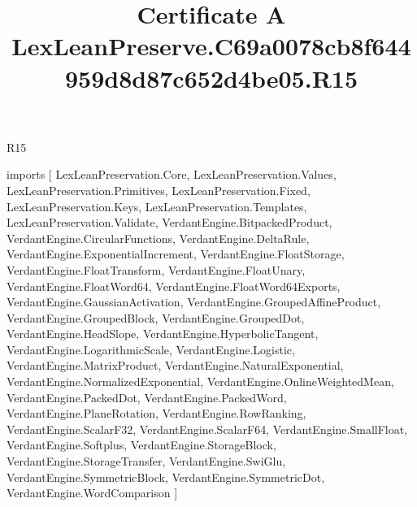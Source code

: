 \begin{lexlean}{R15}
\title{Certificate A LexLeanPreserve.C69a0078cb8f644959d8d87c652d4be05.R15}
\begin{coremodule}
imports [
  LexLeanPreservation.Core,
  LexLeanPreservation.Values,
  LexLeanPreservation.Primitives,
  LexLeanPreservation.Fixed,
  LexLeanPreservation.Keys,
  LexLeanPreservation.Templates,
  LexLeanPreservation.Validate,
  VerdantEngine.BitpackedProduct,
  VerdantEngine.CircularFunctions,
  VerdantEngine.DeltaRule,
  VerdantEngine.ExponentialIncrement,
  VerdantEngine.FloatStorage,
  VerdantEngine.FloatTransform,
  VerdantEngine.FloatUnary,
  VerdantEngine.FloatWord64,
  VerdantEngine.FloatWord64Exports,
  VerdantEngine.GaussianActivation,
  VerdantEngine.GroupedAffineProduct,
  VerdantEngine.GroupedBlock,
  VerdantEngine.GroupedDot,
  VerdantEngine.HeadSlope,
  VerdantEngine.HyperbolicTangent,
  VerdantEngine.LogarithmicScale,
  VerdantEngine.Logistic,
  VerdantEngine.MatrixProduct,
  VerdantEngine.NaturalExponential,
  VerdantEngine.NormalizedExponential,
  VerdantEngine.OnlineWeightedMean,
  VerdantEngine.PackedDot,
  VerdantEngine.PackedWord,
  VerdantEngine.PlaneRotation,
  VerdantEngine.RowRanking,
  VerdantEngine.ScalarF32,
  VerdantEngine.ScalarF64,
  VerdantEngine.SmallFloat,
  VerdantEngine.Softplus,
  VerdantEngine.StorageBlock,
  VerdantEngine.StorageTransfer,
  VerdantEngine.SwiGlu,
  VerdantEngine.SymmetricBlock,
  VerdantEngine.SymmetricDot,
  VerdantEngine.WordComparison
]


\end{coremodule}
\end{lexlean}

